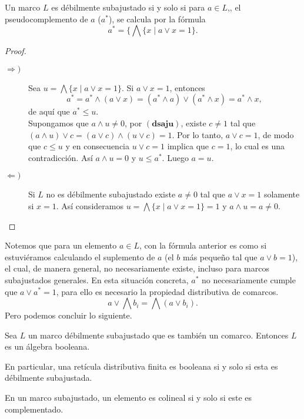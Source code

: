 \begin{thm}\label{Pseudocomplemento}
    Un marco $L$ es débilmente subajustado si y solo si para $a\in L$,, el pseudocomplemento de $a$ ($a^*$), se calcula por la fórmula 
    \[
    a^*=\{\bigwedge\{x\mid a\vee x=1\}.
    \]
\end{thm}

\begin{proof}
    \begin{description}
        \item[$\Rightarrow )$] Sea $u=\bigwedge\{x\mid a\vee x=1\}$. Si $a\vee x=1$, entonces 
        \[
        a^*=a^*\wedge(a\vee x)=(a^*\wedge a)\vee (a^*\wedge x)=a^*\wedge x,
        \]
        de aquí que $a^*\leq u$.\\

        \noindent
        Supongamos que $a\wedge u\neq 0$, por $(\mathbf{dsaju})$, existe $c\neq 1$ tal que $(a\wedge u)\vee c=(a\vee c)\wedge (u\vee c)=1$. Por lo tanto, $a\vee c=1$, de modo que $c\leq u$ y en consecuencia $u\vee c=1$ implica que $c=1$, lo cual es una contradicción. Así $a\wedge u=0$ y $u\leq a^*$. Luego $a=u$.
        \item[$\Leftarrow )$] Si $L$ no es débilmente subajustado existe $a\neq 0$ tal que $a\vee x=1$ solamente si $x=1$. Así consideramos $u=\bigwedge\{x\mid a\vee x=1\}=1$ y $a\wedge u=a\neq 0$. 
    \end{description}
\end{proof}

Notemos que para un elemento $a\in L$, con la fórmula anterior es como si estuviéramos calculando el suplemento de $a$ (el $b$ más pequeño tal que $a\vee b=1$), el cual, de manera general, no necesariamente existe, incluso para marcos subajustados generales. En esta situación concreta, $a^*$ no necesariamente cumple que $a\vee a^*=1$, para ello es necesario la propiedad distributiva de comarcos.
\[
a\vee \bigwedge b_i=\bigwedge (a\vee b_i).
\]
Pero podemos concluir lo siguiente.

\begin{thm}
    Sea $L$ un marco débilmente subajustado que es también un comarco. Entonces $L$ es un álgebra booleana.
\end{thm}

En particular, una retícula distributiva finita es booleana si y solo si esta es débilmente subajustada.

\begin{prop}
    En un marco subajustado, un elemento es colineal si y solo si este es complementado.
\end{prop}

